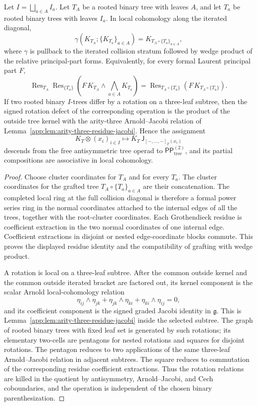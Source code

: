 \begin{lem}
\label{app:lem:tree-kernel-rotation-coherence}
Let \(I=\bigsqcup_{a\in A}I_a\).  Let \(T_A\) be a rooted binary tree
with leaves \(A\), and let \(T_a\) be rooted binary trees with leaves
\(I_a\).  In local cohomology along the iterated diagonal,
\[
  \gamma(K_{T_A};\{K_{T_a}\}_{a\in A})
  =
  K_{T_A\circ\{T_a\}_{a\in A}},
\]
where \(\gamma\) is pullback to the iterated collision stratum followed
by wedge product of the relative principal-part forms.  Equivalently,
for every formal Laurent principal part \(F\),
\[
  \operatorname{Res}_{T_A}
  \operatorname{Res}_{\{T_a\}}
  \left(F\,K_{T_A}\wedge\bigwedge_{a\in A}K_{T_a}\right)
  =
  \operatorname{Res}_{T_A\circ\{T_a\}}
  \left(F\,K_{T_A\circ\{T_a\}}\right).
\]
If two rooted binary \(I\)-trees differ by a rotation on a three-leaf
subtree, then the signed rotation defect of the corresponding operation
is the product of the outside tree kernel with the arity-three
Arnold--Jacobi relation of
Lemma~\ref{app:lem:arity-three-residue-jacobi}.  Hence the assignment
\[
  K_T\otimes(x_i)_{i\in I}
  \longmapsto
  K_T\,\mathsf J_{[-,\ldots,-]_T(x_i)}
\]
descends from the free antisymmetric tree operad to
\(\mathsf{PP}^{(2)}_{\mathrm{tree}}\), and its partial compositions are
associative in local cohomology.
\end{lem}

\begin{proof}
Choose cluster coordinates for \(T_A\) and for every \(T_a\).  The
cluster coordinates for the grafted tree
\(T_A\circ\{T_a\}_{a\in A}\) are their concatenation.  The completed
local ring at the full collision diagonal is therefore a formal power
series ring in the normal coordinates attached to the internal edges of
all the trees, together with the root-cluster coordinates.  Each
Grothendieck residue is coefficient extraction in the two normal
coordinates of one internal edge.  Coefficient extractions in disjoint
or nested edge-coordinate blocks commute.  This proves the displayed
residue identity and the compatibility of grafting with wedge product.

A rotation is local on a three-leaf subtree.  After the common outside
kernel and the common outside iterated bracket are factored out, its
kernel component is the scalar Arnold local-cohomology relation
\[
  \eta_{ij}\wedge\eta_{jk}
  +\eta_{jk}\wedge\eta_{ki}
  +\eta_{ki}\wedge\eta_{ij}=0,
\]
and its coefficient component is the signed graded Jacobi identity in
\(\mathfrak g\).  This is
Lemma~\ref{app:lem:arity-three-residue-jacobi} inside the selected
subtree.  The graph of rooted binary trees with fixed leaf set is
generated by such rotations; its elementary two-cells are pentagons for
nested rotations and squares for disjoint rotations.  The pentagon
reduces to two applications of the same three-leaf Arnold--Jacobi
relation in adjacent subtrees.  The square reduces to commutation of
the corresponding residue coefficient extractions.  Thus the rotation
relations are killed in the quotient by antisymmetry, Arnold--Jacobi,
and Cech coboundaries, and the operation is independent of the chosen
binary parenthesization.
\end{proof}

